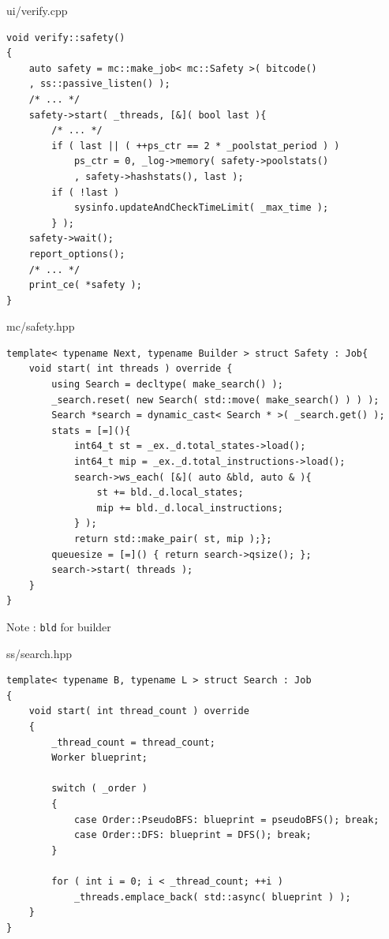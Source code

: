 \documentclass[12pt]{beamer}
\newcommand{\code}[1]{\texttt{#1}}
\begin{document}
\begin{frame}[fragile]{ui/verify.cpp}
\begin{lstlisting}[basicstyle=\footnotesize\ttfamily]
void verify::safety()
{
    auto safety = mc::make_job< mc::Safety >( bitcode()
    , ss::passive_listen() );
    /* ... */
    safety->start( _threads, [&]( bool last ){
        /* ... */
        if ( last || ( ++ps_ctr == 2 * _poolstat_period ) )
            ps_ctr = 0, _log->memory( safety->poolstats()
            , safety->hashstats(), last );
        if ( !last )
            sysinfo.updateAndCheckTimeLimit( _max_time );
        } );
    safety->wait();
    report_options();
    /* ... */
    print_ce( *safety );
}
\end{lstlisting}
\end{frame}

\begin{frame}[fragile]{mc/safety.hpp}
\begin{lstlisting}[basicstyle=\footnotesize\ttfamily]
template< typename Next, typename Builder > struct Safety : Job{
    void start( int threads ) override {
        using Search = decltype( make_search() );
        _search.reset( new Search( std::move( make_search() ) ) );
        Search *search = dynamic_cast< Search * >( _search.get() );
        stats = [=](){
            int64_t st = _ex._d.total_states->load();
            int64_t mip = _ex._d.total_instructions->load();
            search->ws_each( [&]( auto &bld, auto & ){
                st += bld._d.local_states;
                mip += bld._d.local_instructions;
            } );
            return std::make_pair( st, mip );};
        queuesize = [=]() { return search->qsize(); };
        search->start( threads );
    }
}
\end{lstlisting}
Note : \code{bld} for builder
\end{frame}

\begin{frame}[fragile]{ss/search.hpp}
\begin{lstlisting}[basicstyle=\footnotesize\ttfamily]
template< typename B, typename L > struct Search : Job
{
    void start( int thread_count ) override
    {
        _thread_count = thread_count;
        Worker blueprint;

        switch ( _order )
        {
            case Order::PseudoBFS: blueprint = pseudoBFS(); break;
            case Order::DFS: blueprint = DFS(); break;
        }

        for ( int i = 0; i < _thread_count; ++i )
            _threads.emplace_back( std::async( blueprint ) );
    }
}
\end{lstlisting}
\end{frame}
\end{document}
